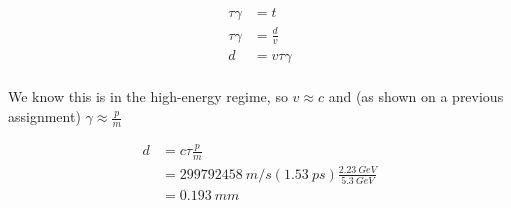 \begin{align*}
    \tau \gamma &= t \\
    \tau \gamma &= \frac{d}{v} \\
    d &= v \tau \gamma \\
\end{align*}

We know this is in the high-energy regime, so $v \approx c$ and (as shown on a previous assignment) $\gamma \approx \frac{p}{m}$

\begin{align*}
    d &= c \tau \frac{p}{m}\\
    &= \SI{299792458}{m / s}(\SI{1.53}{ps})\frac{\SI{2.23}{GeV}}{\SI{5.3}{GeV}} \\
    &= \SI{0.193}{mm}
\end{align*}
